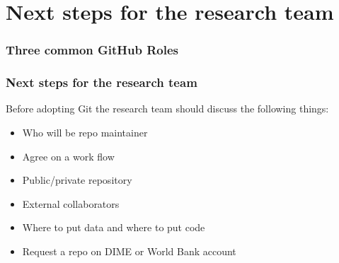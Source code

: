 \documentclass[aspectratio=169]{beamer} %
\begin{document}
\section{Next steps for the research team}

\begin{frame}
\frametitle{Three common GitHub Roles}

	

\end{frame}

\begin{frame}
\frametitle{Next steps for the research team}

	Before adopting Git the research team should discuss the following things:

	\begin{itemize}
		\item Who will be repo maintainer
		\item Agree on a work flow
		\item Public/private repository
		\item External collaborators
		\item Where to put data and where to put code
		\item Request a repo on DIME or World Bank account
	\end{itemize}

\end{frame}




\end{document}
